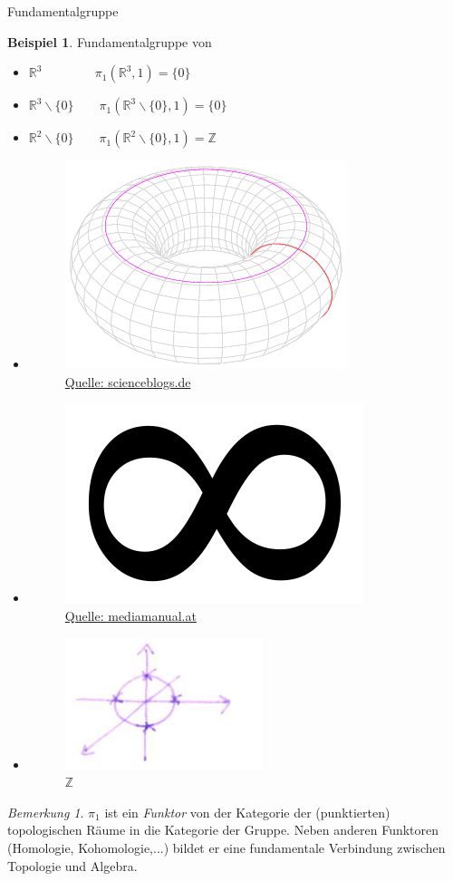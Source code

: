 \documentclass[a4paper,pagesizefontsize=12pt]{scrartcl}
\newcommand\R{\mathbb{R}}
\newcommand\Z{\mathbb{Z}}
\theoremstyle{definition}
\newtheorem*{bsp*}{Beispiel}
\theoremstyle{remark}
\newtheorem*{bem*}{Bemerkung}
\begin{document}
\begin{section}{Fundamentalgruppe}
\begin{bsp*}Fundamentalgruppe von 
\begin{itemize}
\item $  \R ^3\qquad \, \qquad  \pi_1(\R ^3,1) = \{0\}$
\item $\R ^3 \backslash \{0\} \qquad  \pi_1(\R ^3\backslash\{0\},1)= \{0\}$
\item $\R ^2 \backslash \{0\} \qquad  \pi_1(\R ^2\backslash\{0\},1)= \Z$
\item 
\begin{figure}[H]
\center
\includegraphics[width=0.25\linewidth]{Torus}
\caption*{$\Z \times \Z$ }
\caption*{\href{http://scienceblogs.de/mathlog/wp-content/blogs.dir/18/files/2012/06/i-7dd715a5c3485c289f4b74c61c3993ac-Torus\_cycles.png}{Quelle: scienceblogs.de}}
\end{figure}
\item 
\begin{figure}[H]
\center
\includegraphics[width=0.25\linewidth]{Unendlich}
\caption*{$\Z \star \Z$ }
\caption*{\href{http://www.mediamanual.at/mediamanual/workshop/visual/image/unendlich.png}{Quelle: mediamanual.at}}
\end{figure}
\item 
\begin{figure}[H]
\center
\includegraphics[width=0.35\linewidth]{Kreis}
\caption*{$\Z$}
\end{figure}
\end{itemize}
\end{bsp*}

\begin{bem*}
$\pi_1$ ist ein \textit{Funktor} von der Kategorie der (punktierten) topologischen Räume in die Kategorie der Gruppe. Neben anderen Funktoren (Homologie, Kohomologie,...) bildet er eine fundamentale Verbindung zwischen Topologie und Algebra.
\end{bem*}

\end{section}
\end{document}
